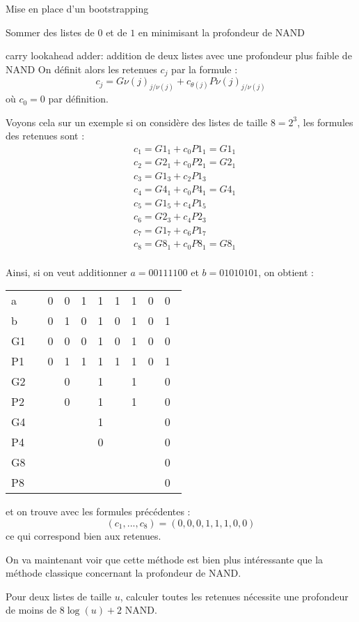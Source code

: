 \begin{section}{Mise en place d'un bootstrapping}
\begin{subsection}{Sommer des listes de $0$ et de $1$ en minimisant la profondeur de NAND}
\begin{subsubsection}{carry lookahead adder: addition de deux listes avec une profondeur plus faible de NAND}
	On définit alors les retenues $c_j$ par la formule :
\begin{equation}
\label{cla}
c_j = {G\nu(j)}_{j/\nu(j)} + c_{\theta(j)} {P\nu(j)}_{j/\nu(j)}
\end{equation}
	où $c_0 = 0$ par définition.

	Voyons cela sur un exemple si on considère des listes de taille $8 = 2^3$, les formules des retenues sont :
\begin{align*}
&c_1 = {G1_1} + c_0 {P1_1} = {G1_1} \\
&c_2 = {G2_1} + c_0 {P2_1} = {G2_1}  \\
&c_3 = {G1_3} + c_2 {P1_3}\\
&c_4 = {G4_1} + c_0 {P4_1} = {G4_1} \\
&c_5 = {G1_5} + c_4 {P1_5}\\
&c_6 = {G2_3} + c_4 {P2_3} \\
&c_7 = {G1_7} + c_6 {P1_7} \\
&c_8 = {G8_1} + c_0 {P8_1} = {G8_1} \\
\end{align*}

	Ainsi, si on veut additionner $a = 00111100$ et $b = 01010101$, on obtient :
\begin{center}
\begin{tabular}{llllllllll}
a  && 0&0&1&1&1&1&0&0 \\
b  && 0&1&0&1&0&1&0&1 \\
G1 && 0&0&0&1&0&1&0&0 \\
P1 && 0&1&1&1&1&1&0&1 \\
G2 && &0&&1&&1&&0 \\
P2 && &0&&1&&1&&0 \\
G4 && &&&1&&&&0 \\
P4 && &&&0&&&&0 \\
G8 && &&&&&&&0 \\
P8 && &&&&&&&0 \\
\end{tabular}
\end{center}

	et on trouve avec les formules précédentes :
\[ (c_1, ..., c_8) = (0,0,0,1,1,1,0,0) \]
	ce qui correspond bien aux retenues.

	On va maintenant voir que cette méthode est bien plus intéressante que la méthode classique concernant la profondeur de NAND.
\begin{prop}
	Pour deux listes de taille $u$, calculer toutes les retenues nécessite une profondeur de moins de $8 \log(u) + 2$ NAND.
\end{prop}


\end{subsubsection}
\end{subsection}
\end{section}
